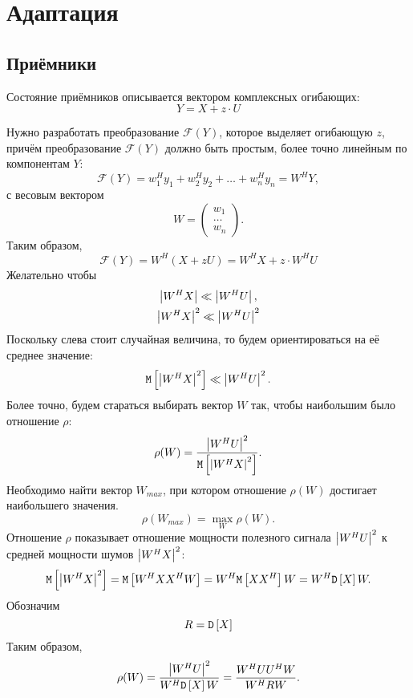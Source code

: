 \chapter{Адаптация}


\section{Приёмники}

Состояние приёмников описывается вектором комплексных огибающих:
\[
    Y = X + z \cdot U
\]

Нужно разработать преобразование $\mathcal{F}(Y)$, которое выделяет огибающую $z$, причём преобразование $\mathcal{F}(Y)$ должно быть простым, более точно линейным
по компонентам $Y$:
\[
    \mathcal{F}(Y)
    = w_1^H y_1 + w_2^H y_2 + \dots + w_n^H y_n
    = W^H Y ,
\]
с весовым вектором
\[
    W =
    \begin{pmatrix}
        w_1   \\
        \dots \\
        w_n
    \end{pmatrix} .
\]
Таким образом,
\[
    \mathcal{F}(Y)
    = W^H \left ( X + z U\right )
    = W^H X + z \cdot W^H U
\]
Желательно чтобы
\begin{gather*}
    \left | W^H X \right | \ll \left | W^H U \right | , \\
    \left | W^H X \right |^2 \ll \left | W^H U \right |^2
\end{gather*}
Поскольку слева стоит случайная величина, то будем ориентироваться на её среднее значение:
\[
    \mathtt{M} \left [ \left | W^H X \right |^2 \right ] \ll \left | W^H U \right |^2 .
\]
Более точно, будем стараться выбирать вектор $W$ так, чтобы наибольшим было отношение $\rho$:
\[
    \rho ( W ) = \frac{\left | W^H U \right |^2}{\mathtt{M} \left [ \left | W^H X \right |^2 \right ]} .
\]
Необходимо найти вектор $W_{max}$, при котором отношение $\rho(W)$ достигает наибольшего значения.
\[
    \rho(W_{max}) = \max \limits_W \rho(W) .
\]
Отношение $\rho$ показывает отношение мощности полезного сигнала $\left | W^H U \right |^2$ к средней мощности шумов $\left | W^H X \right |^2$:
\[
    \mathtt{M} \left [ \left | W^H X \right |^2 \right ]
    = \mathtt{M} \left [ W^H X X^H W \right ]
    = W^H \mathtt{M} \left [ X X^H \right ] W
    = W^H \mathtt{D} \left [ X \right ] W .
\]
Обозначим
\[
    R = \mathtt{D} \left [ X \right ]
\]
Таким образом,
\[
    \rho ( W )
    = \frac{\left | W^H U \right |^2}{W^H \mathtt{D} \left [ X \right ] W}
    = \frac{W^H U U^H W}{W^H R W} .
\]

